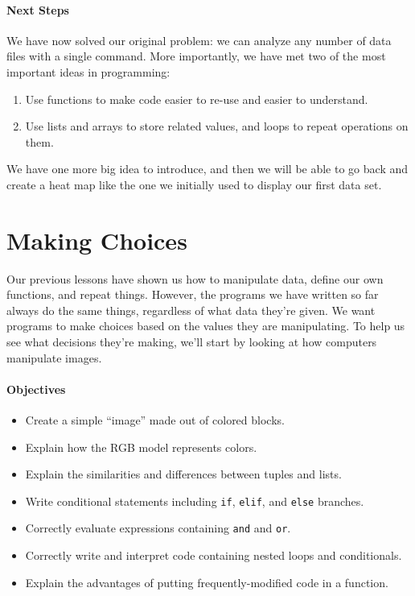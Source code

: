 \documentclass[]{book}
\begin{document}
\mbox{}\paragraph{Next Steps}

We have now solved our original problem: we can analyze any number of
data files with a single command. More importantly, we have met two of
the most important ideas in programming:

\begin{enumerate}
\item
  Use functions to make code easier to re-use and easier to understand.
\item
  Use lists and arrays to store related values, and loops to repeat
  operations on them.
\end{enumerate}

We have one more big idea to introduce, and then we will be able to go
back and create a heat map like the one we initially used to display our
first data set.

\section{Making Choices}

Our previous lessons have shown us how to manipulate data, define our
own functions, and repeat things. However, the programs we have written
so far always do the same things, regardless of what data they're given.
We want programs to make choices based on the values they are
manipulating. To help us see what decisions they're making, we'll start
by looking at how computers manipulate images.

\mbox{}\paragraph{Objectives}

\begin{itemize}
\item
  Create a simple ``image'' made out of colored blocks.
\item
  Explain how the RGB model represents colors.
\item
  Explain the similarities and differences between tuples and lists.
\item
  Write conditional statements including \texttt{if}, \texttt{elif}, and
  \texttt{else} branches.
\item
  Correctly evaluate expressions containing \texttt{and} and
  \texttt{or}.
\item
  Correctly write and interpret code containing nested loops and
  conditionals.
\item
  Explain the advantages of putting frequently-modified code in a
  function.
\end{itemize}
\end{document}
